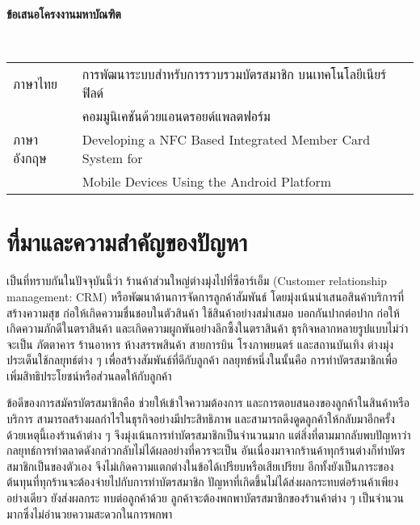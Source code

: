 \documentclass[a4paper]{article}
\begin{document}
\clearpage

\begin{center}
{\huge \bf ข้อเสนอโครงงานมหาบัณฑิต}
\end{center}

 \\

\Large{\noindent\hspace{0.7cm}\setlength{\tabcolsep}{15pt}
\begin{tabular}{l l}    
	ภาษาไทย 		& การพัฒนาระบบสำหรับการรวบรวมบัตรสมาชิก บนเทคโนโลยีเนียร์ฟิลด์ \\
				& คอมมูนิเคชันด้วยแอนดรอยด์แพลตฟอร์ม \\
	ภาษาอังกฤษ	& Developing a NFC Based Integrated Member Card System for \\
				& Mobile Devices Using the Android Platform \\    
\end{tabular}
}

\section{ที่มาและความสำคัญของปัญหา}
เป็นที่ทราบกันในปัจจุบันนี้ว่า ร้านค้าส่วนใหญ่ต่างมุ่งไปที่ซีอาร์เอ็ม (Customer relationship management: CRM) หรือพัฒนาด้านการจัดการลูกค้าสัมพันธ์ โดยมุ่งเน้นนำเสนอสินค้าบริการที่สร้างความสุข ก่อให้เกิดความชื่นชอบในตัวสินค้า ใช้สินค้าอย่างสม่ำเสมอ บอกกันปากต่อปาก ก่อให้เกิดความภักดีในตราสินค้า และเกิดความผูกพันอย่างลึกซึ้งในตราสินค้า ธุรกิจหลากหลายรูปแบบไม่ว่าจะเป็น ภัตตาคาร ร้านอาหาร ห้างสรรพสินค้า สายการบิน โรงภาพยนตร์ และสถานบันเทิง ต่างมุ่งประเด็นใช้กลยุทธ์ต่าง ๆ เพื่อสร้างสัมพันธ์ที่ดีกับลูกค้า กลยุทธ์หนึ่งในนั้นคือ การทำบัตรสมาชิกเพื่อเพิ่มสิทธิประโยชน์หรือส่วนลดให้กับลูกค้า

ข้อดีของการสมัครบัตรสมาชิกคือ ช่วยให้เข้าใจความต้องการ และการตอบสนองของลูกค้าในสินค้าหรือบริการ สามารถสร้างผลกําไรในธุรกิจอย่างมีประสิทธิภาพ และสามารถดึงดูดลูกค้าให้กลับมาอีกครั้ง ด้วยเหตุนี้เองร้านค้าต่าง ๆ จึงมุ่งเน้นการทำบัตรสมาชิกเป็นจำนวนมาก แต่สิ่งที่ตามมากลับพบปัญหาว่ากลยุทธ์การทำตลาดดังกล่าวกลับไม่ได้ผลอย่างที่ควรจะเป็น อันเนื่องมาจากร้านค้าทุกร้านต่างก็ทำบัตรสมาชิกเป็นของตัวเอง จึงไม่เกิดความแตกต่างในข้อได้เปรียบหรือเสียเปรียบ อีกทั้งยังเป็นภาระของต้นทุนที่ทุกร้านจะต้องจ่ายไปกับการทำบัตรสมาชิก ปัญหาที่เกิดขึ้นไม่ได้ส่งผลกระทบต่อร้านค้าเพียงอย่างเดียว  ยังส่งผลกระ \newline ทบต่อลูกค้าด้วย ลูกค้าจะต้องพกพาบัตรสมาชิกของร้านค้าต่าง ๆ เป็นจำนวนมากซึ่งไม่อำนวยความสะดวกในการพกพา
\end{document}
